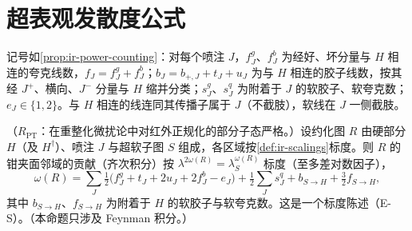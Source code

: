 \section{超表观发散度公式}\label{sec:appE-formula}

记号如\cref{prop:ir-power-counting}：对每个喷注 $J$，$f^g_J$、$f^b_J$ 为经好、坏分量与 $H$ 相连的夸克线数，$f_J=f^g_J+f^b_J$；$b_J=b_{+,J}+t_J+u_J$ 为与 $H$ 相连的胶子线数，按其经 $J^+$、横向、$J^-$ 分量与 $H$ 缩并分类；$s^g_J$、$s^q_J$ 为附着于 $J$ 的软胶子、软夸克数；$e_J\in\{1,2\}$。与 $H$ 相连的线连同其传播子属于 $J$（不截肢），软线在 $J$ 一侧截肢。

\begin{proposition}\label{prop:appE-degree}
（$R_{\mathrm{PT}}$：在重整化微扰论中对红外正规化的部分子态严格。）设约化图 $R$ 由硬部分 $H$（及 $H^\dagger$）、喷注 $J$ 与超软子图 $S$ 组成，各区域按\cref{def:ir-scalings}标度。则 $R$ 的钳夹面邻域的贡献（齐次积分）按 $\lambda^{2\omega(R)}=\lambda_S^{\omega(R)}$ 标度（至多差对数因子），
\begin{equation}\label{eq:appE-omega}
\omega(R)=\sum_J\tfrac12\big(f^g_J+t_J+2u_J+2f^b_J-e_J\big)+\tfrac12\sum_Js^q_J+b_{S\to H}+\tfrac32f_{S\to H} ,
\end{equation}
其中 $b_{S\to H}$、$f_{S\to H}$ 为附着于 $H$ 的软胶子与软夸克数。这是一个标度陈述（E-S）。（本命题只涉及 Feynman 积分。）
\end{proposition}
